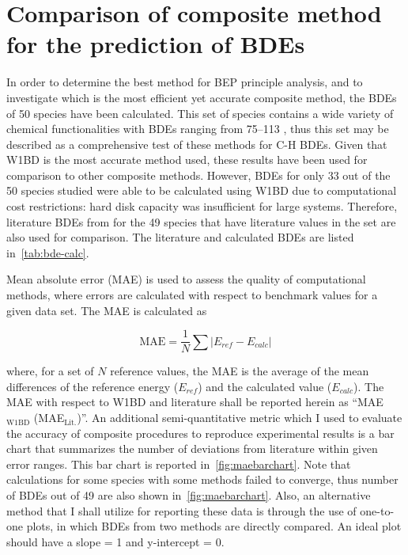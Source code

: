 \section{Comparison of composite method for the prediction of BDEs}

In order to determine the best method for BEP principle analysis, and to investigate which is the most efficient yet accurate composite method, the BDEs of 50 species have been calculated. This set of species contains a wide variety of chemical functionalities with BDEs ranging from 75--113 \kcalmol, thus this set may be described as a comprehensive test of these methods for C-H BDEs. Given that W1BD is the most accurate method used, these results have been used for comparison to other composite methods. However, BDEs for only 33 out of the 50 species studied were able to be calculated using W1BD due to computational cost restrictions: hard disk capacity was insufficient for large systems. Therefore, literature BDEs from \citet{Luo2002} for the 49 species that have literature values in the set are also used for comparison. The literature and calculated BDEs are listed in~\ref{tab:bde-calc}.



Mean absolute error (MAE) is used to assess the quality of computational methods, where errors are calculated with respect to benchmark values for a given data set.\cite{Savin2014} The MAE is calculated as

\begin{equation}
  \mathrm{MAE} = \frac{1}{N} \sum | E_{ref} - E_{calc}|
\end{equation}

\noindent where, for a set of $N$ reference values, the MAE is the average of the mean differences of the reference energy ($E_{ref}$) and the calculated value ($E_{calc}$). The MAE with respect to W1BD and literature shall be reported herein as ``MAE$_{\mathrm{W1BD}}$ (MAE$_{\mathrm{Lit.}}$)''. An additional semi-quantitative metric which I used to evaluate the accuracy of composite procedures to reproduce experimental results is a bar chart that summarizes the number of deviations from literature within given error ranges. This bar chart is reported in~\ref{fig:maebarchart}. Note that calculations for some species with some methods failed to converge, thus number of BDEs out of 49 are also shown in~\ref{fig:maebarchart}. Also, an alternative method that I shall utilize for reporting these data is through the use of one-to-one plots, in which BDEs from two methods are directly compared. An ideal plot should have a slope = 1 and y-intercept = 0.

